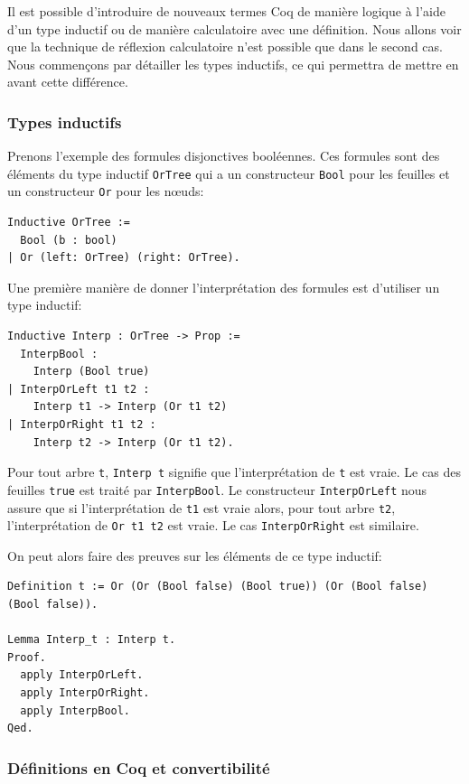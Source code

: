 \documentclass[11pt]{article}
\begin{document}
Il est possible d'introduire de nouveaux termes Coq de manière logique à l'aide d'un type  inductif ou de manière calculatoire avec une définition. Nous allons voir que la technique de réflexion calculatoire n'est possible que dans le second cas. Nous commençons par détailler les types inductifs, ce qui permettra de mettre en avant cette différence.

\subsubsection{Types inductifs}

Prenons l'exemple des formules disjonctives booléennes. Ces formules sont des éléments du type inductif \texttt{OrTree} qui a un constructeur \texttt{Bool} pour les feuilles et un constructeur \texttt{Or} pour les nœuds: 

\begin{lstlisting}[frame=single]
Inductive OrTree :=
  Bool (b : bool)
| Or (left: OrTree) (right: OrTree).
\end{lstlisting}

Une première manière de donner l'interprétation des formules est d'utiliser un type inductif:

\begin{lstlisting}[frame=single]
Inductive Interp : OrTree -> Prop :=
  InterpBool :
    Interp (Bool true) 
| InterpOrLeft t1 t2 :
    Interp t1 -> Interp (Or t1 t2) 
| InterpOrRight t1 t2 :
    Interp t2 -> Interp (Or t1 t2).
\end{lstlisting}

Pour tout arbre \texttt{t}, \texttt{Interp t} signifie que l'interprétation de  \texttt{t} est vraie. Le cas des feuilles \texttt{true} est traité par \texttt{InterpBool}. Le constructeur \texttt{InterpOrLeft} nous assure que si l'interprétation de \texttt{t1} est vraie alors, pour tout arbre \texttt{t2}, l'interprétation de \texttt{Or t1 t2} est vraie. Le cas \texttt{InterpOrRight} est similaire.\medbreak

On peut alors faire des preuves sur les éléments de ce type inductif: 
\begin{lstlisting}[frame=single]
Definition t := Or (Or (Bool false) (Bool true)) (Or (Bool false) (Bool false)).

Lemma Interp_t : Interp t.
Proof.
  apply InterpOrLeft.
  apply InterpOrRight.
  apply InterpBool.
Qed.
\end{lstlisting}

\subsubsection{Définitions en Coq et convertibilité}
\end{document}
